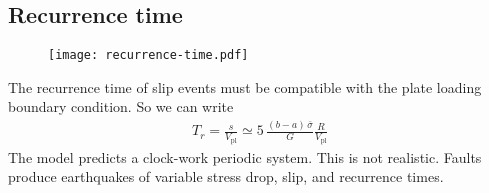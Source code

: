 \documentclass[letterpaper,12pt,]{memoir}
\begin{document}
\subsection{Recurrence time}
%
\begin{figure}[h]
\begin{center}
\texttt{[image: recurrence-time.pdf]}
\end{center}
\vspace{-0.5cm}
\end{figure}
%
The recurrence time of slip events must be compatible with the plate loading boundary condition. So we can write
\begin{equation}
\boxed{\begin{aligned}
T_r=\frac{s}{V_\text{pl}}\simeq 5\,\frac{(b-a)\,\bar{\sigma}}{G}\frac{R}{V_\text{pl}}
\end{aligned}}
\end{equation}
The model predicts a clock-work periodic system. This is not realistic. Faults produce earthquakes of variable stress drop, slip, and recurrence times. 


\end{document}
